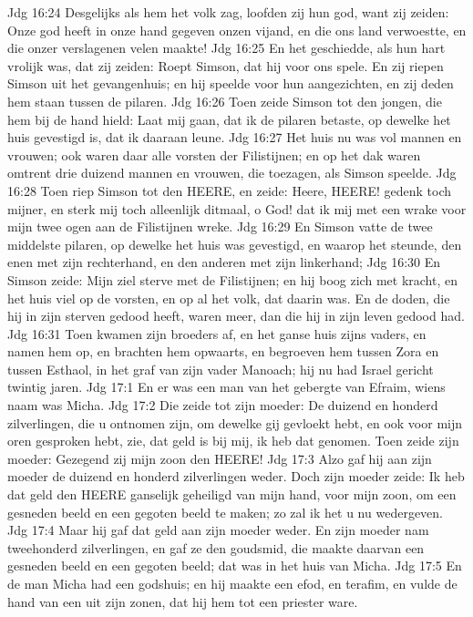 Jdg 16:24  Desgelijks als hem het volk zag, loofden zij hun god, want zij zeiden: Onze god heeft in onze hand gegeven onzen vijand, en die ons land verwoestte, en die onzer verslagenen velen maakte!
Jdg 16:25  En het geschiedde, als hun hart vrolijk was, dat zij zeiden: Roept Simson, dat hij voor ons spele. En zij riepen Simson uit het gevangenhuis; en hij speelde voor hun aangezichten, en zij deden hem staan tussen de pilaren.
Jdg 16:26  Toen zeide Simson tot den jongen, die hem bij de hand hield: Laat mij gaan, dat ik de pilaren betaste, op dewelke het huis gevestigd is, dat ik daaraan leune.
Jdg 16:27  Het huis nu was vol mannen en vrouwen; ook waren daar alle vorsten der Filistijnen; en op het dak waren omtrent drie duizend mannen en vrouwen, die toezagen, als Simson speelde.
Jdg 16:28  Toen riep Simson tot den HEERE, en zeide: Heere, HEERE! gedenk toch mijner, en sterk mij toch alleenlijk ditmaal, o God! dat ik mij met een wrake voor mijn twee ogen aan de Filistijnen wreke.
Jdg 16:29  En Simson vatte de twee middelste pilaren, op dewelke het huis was gevestigd, en waarop het steunde, den enen met zijn rechterhand, en den anderen met zijn linkerhand;
Jdg 16:30  En Simson zeide: Mijn ziel sterve met de Filistijnen; en hij boog zich met kracht, en het huis viel op de vorsten, en op al het volk, dat daarin was. En de doden, die hij in zijn sterven gedood heeft, waren meer, dan die hij in zijn leven gedood had.
Jdg 16:31  Toen kwamen zijn broeders af, en het ganse huis zijns vaders, en namen hem op, en brachten hem opwaarts, en begroeven hem tussen Zora en tussen Esthaol, in het graf van zijn vader Manoach; hij nu had Israel gericht twintig jaren.
Jdg 17:1  En er was een man van het gebergte van Efraim, wiens naam was Micha.
Jdg 17:2  Die zeide tot zijn moeder: De duizend en honderd zilverlingen, die u ontnomen zijn, om dewelke gij gevloekt hebt, en ook voor mijn oren gesproken hebt, zie, dat geld is bij mij, ik heb dat genomen. Toen zeide zijn moeder: Gezegend zij mijn zoon den HEERE!
Jdg 17:3  Alzo gaf hij aan zijn moeder de duizend en honderd zilverlingen weder. Doch zijn moeder zeide: Ik heb dat geld den HEERE ganselijk geheiligd van mijn hand, voor mijn zoon, om een gesneden beeld en een gegoten beeld te maken; zo zal ik het u nu wedergeven.
Jdg 17:4  Maar hij gaf dat geld aan zijn moeder weder. En zijn moeder nam tweehonderd zilverlingen, en gaf ze den goudsmid, die maakte daarvan een gesneden beeld en een gegoten beeld; dat was in het huis van Micha.
Jdg 17:5  En de man Micha had een godshuis; en hij maakte een efod, en terafim, en vulde de hand van een uit zijn zonen, dat hij hem tot een priester ware.

